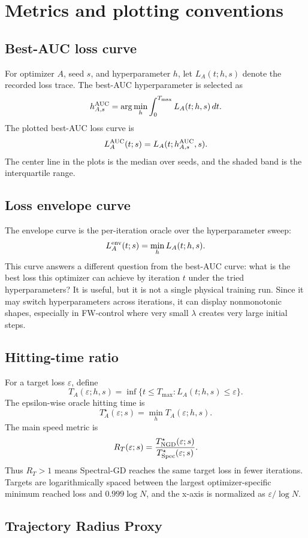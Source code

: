 \documentclass[11pt]{article}
\newcommand{\Tmax}{T_{\max}}
\newcommand{\eps}{\varepsilon}
\newcommand{\tratio}{R_T}
\begin{document}
\section{Metrics and plotting conventions}

\subsection{Best-AUC loss curve}

For optimizer $A$, seed $s$, and hyperparameter $h$, let $L_A(t;h,s)$ denote the recorded loss trace. The best-AUC hyperparameter is selected as
\[
  h^{\rm AUC}_{A,s}
  =
  \arg\min_h \int_0^{\Tmax} L_A(t;h,s)\,dt.
\]
The plotted best-AUC loss curve is
\[
  L_A^{\rm AUC}(t;s)=L_A(t;h^{\rm AUC}_{A,s},s).
\]
The center line in the plots is the median over seeds, and the shaded band is the interquartile range.

\subsection{Loss envelope curve}

The envelope curve is the per-iteration oracle over the hyperparameter sweep:
\[
  L_A^{\rm env}(t;s)=\min_h L_A(t;h,s).
\]
This curve answers a different question from the best-AUC curve: what is the best loss this optimizer can achieve by iteration $t$ under the tried hyperparameters? It is useful, but it is not a single physical training run. Since it may switch hyperparameters across iterations, it can display nonmonotonic shapes, especially in FW-control where very small $\lambda$ creates very large initial steps.

\subsection{Hitting-time ratio}

For a target loss $\eps$, define
\[
  T_A(\eps;h,s)=\inf\{t\leq \Tmax: L_A(t;h,s)\leq \eps\}.
\]
The epsilon-wise oracle hitting time is
\[
  T_A^\star(\eps;s)=\min_h T_A(\eps;h,s).
\]
The main speed metric is
\[
  \tratio(\eps;s)
  =
  \frac{T_{\rm NGD}^\star(\eps;s)}{T_{\rm Spec}^\star(\eps;s)}.
\]
Thus $\tratio>1$ means Spectral-GD reaches the same target loss in fewer iterations. Targets are logarithmically spaced between the largest optimizer-specific minimum reached loss and $0.999\log N$, and the x-axis is normalized as $\eps/\log N$.

\subsection{Trajectory Radius Proxy}
\end{document}
